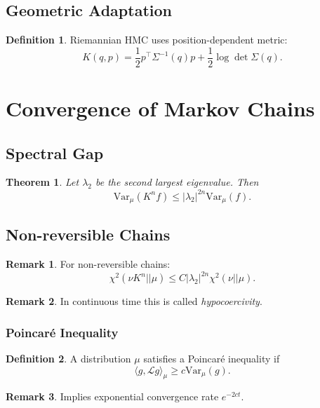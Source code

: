 \documentclass[12pt,oneside]{book}
\numberwithin{equation}{section}
\theoremstyle{definition}
\newtheorem{definition}{Definition}[section]
\newtheorem{remark}{Remark}[section]
\theoremstyle{plain}
\newtheorem{theorem}{Theorem}[section]
\theoremstyle{remark}
\newcommand{\Var}{\mathrm{Var}}
\begin{document}
\subsection*{Geometric Adaptation}

\begin{definition}
Riemannian HMC uses position-dependent metric:
\[
K(q,p) = \frac{1}{2} p^\top \Sigma^{-1}(q)p + \frac{1}{2}\log \det \Sigma(q).
\]
\end{definition}


\section{Convergence of Markov Chains}

\subsection{Spectral Gap}

\begin{theorem}
Let $\lambda_2$ be the second largest eigenvalue. Then
\[
\Var_\mu(K^n f) \le |\lambda_2|^{2n} \Var_\mu(f).
\]
\end{theorem}


\subsection{Non-reversible Chains}

\begin{remark}
For non-reversible chains:
\[
\chi^2(\nu K^n || \mu)
\le C |\lambda_2|^{2n} \chi^2(\nu || \mu).
\]
\end{remark}

\begin{remark}
In continuous time this is called \emph{hypocoercivity}.
\end{remark}


\subsubsection{Poincar\'e Inequality}

\begin{definition}
A distribution $\mu$ satisfies a Poincar\'e inequality if
\[
\langle g, \mathcal{L}g \rangle_\mu \ge c \Var_\mu(g).
\]
\end{definition}

\begin{remark}
Implies exponential convergence rate $e^{-2ct}$.
\end{remark}
\end{document}
